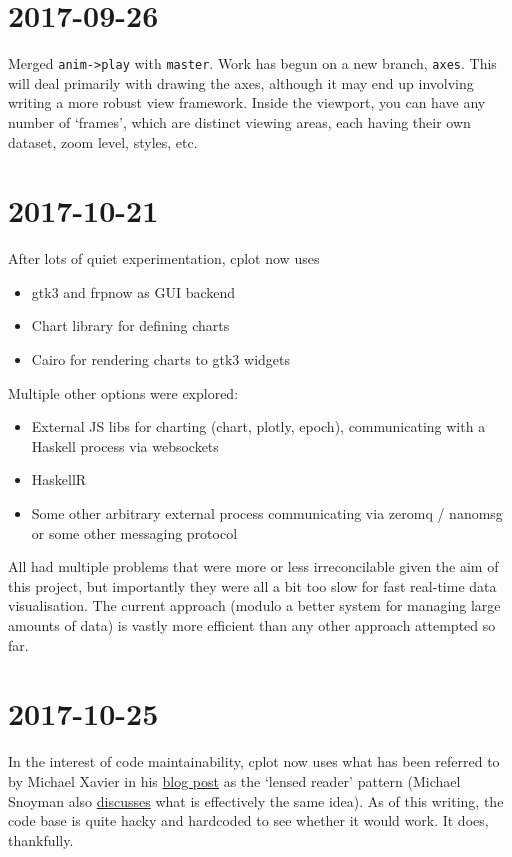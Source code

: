 \documentclass[a5paper,10pt]{article}
\begin{document}
    \section*{2017-09-26}

    Merged \verb|anim->play| with \verb|master|. Work has begun on a new branch, \verb|axes|. This will deal primarily with drawing the axes, although it may end up involving writing a more robust view framework. Inside the viewport, you can have any number of `frames', which are distinct viewing areas, each having their own dataset, zoom level, styles, etc.

    \section*{2017-10-21}

    After lots of quiet experimentation, cplot now uses
    \begin{itemize}
        \item gtk3 and frpnow as GUI backend
        \item Chart library for defining charts
        \item Cairo for rendering charts to gtk3 widgets
    \end{itemize}
    Multiple other options were explored:
    \begin{itemize}
        \item External JS libs for charting (chart, plotly, epoch), communicating with a Haskell process via websockets
        \item HaskellR
        \item Some other arbitrary external process communicating via zeromq / nanomsg or some other messaging protocol
    \end{itemize}
    All had multiple problems that were more or less irreconcilable given the aim of this project, but importantly they were all a bit too slow for fast real-time data visualisation. The current approach (modulo a better system for managing large amounts of data) is vastly more efficient than any other approach attempted so far.
    
    \section*{2017-10-25}
    
    In the interest of code maintainability, cplot now uses what has been referred to by Michael Xavier in his \href{https://michaelxavier.net/posts/2016-04-03-Enterprise-Haskell-Pattern-Lensed-Reader.html}{blog post} as the `lensed reader' pattern (Michael Snoyman also \href{https://www.fpcomplete.com/blog/2017/06/readert-design-pattern}{discusses} what is effectively the same idea). As of this writing, the code base is quite hacky and hardcoded to see whether it would work. It does, thankfully.
    
\end{document}
